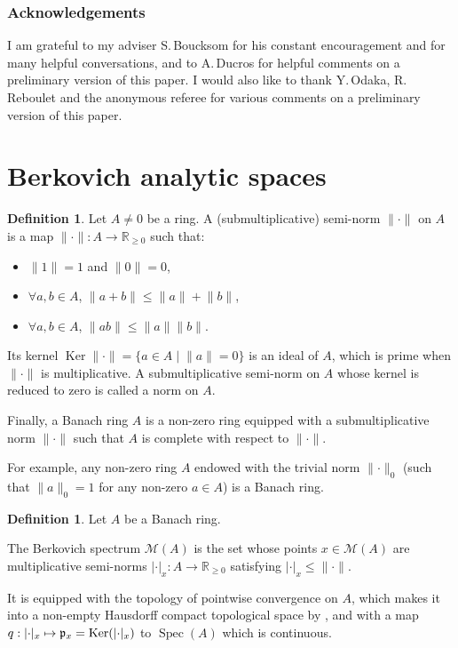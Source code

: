 \documentclass[JEP,XML,SOM,Unicode,published]{cedram}
\newcommand\mto{\mathchoice{\longmapsto}{\mapsto}{\mapsto}{\mapsto}}
\let\sep\mid
\theoremstyle{definition}
\newtheorem{defn}[equation]{Definition}
\newcommand \R{\mathbb R}
\newcommand \M {\mathscr {M}}
\DeclareMathOperator{\Ker}{Ker}
\DeclareMathOperator{\Sp}{Spec}
\begin{document}
\subsubsection*{Acknowledgements} I am grateful to my adviser S.\,Boucksom for his constant encouragement and for many helpful conversations, and to A.\,Ducros for helpful comments on a preliminary version of this paper. I would also like to thank Y.\,Odaka, R.\,Reboulet and the anonymous referee for various comments on a preliminary version of this paper.
\section{Berkovich analytic spaces} \label{sec Berko}
 \label{sec def Berko}
\begin{defn}
Let $A \neq 0$ be a ring. A (submultiplicative) semi-norm $\lVert \cdot \rVert$ on $A$ is a map $\lVert \cdot \rVert: A \to \R_{\ge 0}$ such that:
\begin{itemize}
\item $\lVert 1 \rVert=1$ and $\lVert 0 \rVert=0$,
\item $\forall a, b \in A$, $\lVert a+b \rVert \le \lVert a\rVert+ \lVert b\rVert$,
\item $\forall a, b \in A$, $\lVert ab \rVert \le \lVert a \rVert \lVert b\rVert$.
\end{itemize}
Its kernel $\Ker \lVert \cdot \rVert =\{ a \in A \sep \lVert a\rVert=0 \}$ is an ideal of $A$, which is prime when $\lVert \cdot \rVert$ is multiplicative. A submultiplicative semi-norm on $A$ whose kernel is reduced to zero is called a norm on $A$.

Finally, a Banach ring $A$ is a non-zero ring equipped with a submultiplicative norm $\lVert \cdot \rVert$ such that $A$ is complete with respect to $\lVert \cdot \rVert$.
\end{defn}
For example, any non-zero ring $A$ endowed with the trivial norm $\lVert \cdot \rVert_0$ (such that $\lVert a \rVert_0 =1$ for any non-zero $a \in A$) is a Banach ring.
\begin{defn} Let $A$ be a Banach ring.

The Berkovich spectrum $\M(A)$ is the set whose points $x \in \M(A)$ are multiplicative semi-norms $\lvert \cdot \rvert_x: A \to \R_{\ge 0}$ satisfying $\lvert \cdot \rvert_x \le \lVert \cdot \rVert$.

It is equipped with the topology of pointwise convergence on $A$, which makes it into a non-empty Hausdorff compact topological space by \cite{Ber}, and with a map $q: \lvert \cdot \rvert_x \mto \mathfrak{p}_x = \Ker (\lvert \cdot \rvert_x)$ to $\Sp(A)$ which is continuous.
\end{defn}
\end{document}
